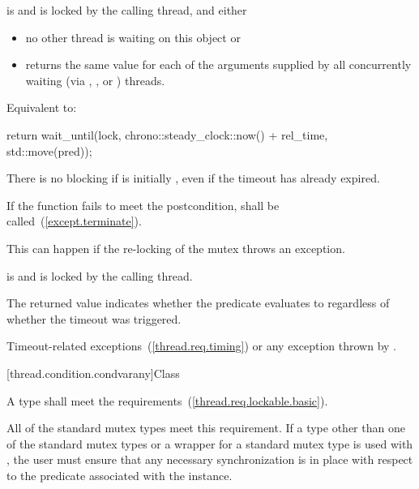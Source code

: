 \begin{itemdescr}
\pnum
\precondition {} is  and 
is locked by the calling thread, and either
\begin{itemize}
\item
no other thread is waiting on this  object or

\item
{} returns the same value for each of the  arguments
supplied by all concurrently waiting (via , , or
) threads.
\end{itemize}

\pnum
\effects Equivalent to:
\begin{codeblock}
return wait_until(lock, chrono::steady_clock::now() + rel_time, std::move(pred));
\end{codeblock}

\pnum
\begin{note} There is no blocking if  is initially , even if the
timeout has already expired. \end{note}

\pnum
\remarks
If the function fails to meet the postcondition, 
shall be called~(\ref{except.terminate}).
\begin{note} This can happen if the re-locking of the mutex throws an exception. \end{note}

\pnum
\postcondition {} is  and 
is locked by the calling thread.

\pnum
\begin{note} The returned value indicates whether the predicate evaluates to 
regardless of whether the timeout was triggered. \end{note}

\pnum
\throws Timeout-related
exceptions~(\ref{thread.req.timing}) or any exception thrown by .

\end{itemdescr}

[thread.condition.condvarany]{Class }

\pnum
A  type shall meet the 
requirements~(\ref{thread.req.lockable.basic}). \begin{note} All of the standard
mutex types meet this requirement. If a  type other than one of the
standard mutex types or a  wrapper for a standard mutex type
is used with , the user must ensure that any
necessary synchronization is in place with respect to the predicate associated
with the  instance. \end{note}

